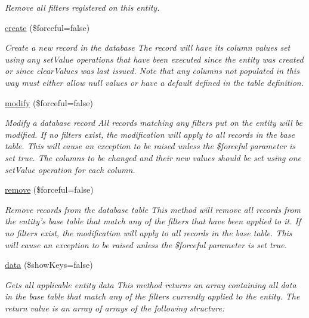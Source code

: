 \begin{DoxyCompactItemize}
\begin{DoxyCompactList}\small\item\em Remove all filters registered on this entity. \end{DoxyCompactList}\item 
\hypertarget{classentity_aa093f16b8fa83dcba92779df20f8a53f}{\hyperlink{classentity_aa093f16b8fa83dcba92779df20f8a53f}{create} (\$forceful=false)}\label{classentity_aa093f16b8fa83dcba92779df20f8a53f}

\begin{DoxyCompactList}\small\item\em Create a new record in the database The record will have its column values set using any set\-Value operations that have been executed since the entity was created or since clear\-Values was last issued. Note that any columns not populated in this way must either allow null values or have a default defined in the table definition. \end{DoxyCompactList}\item 
\hyperlink{classentity_a93f973ae16957a93f792003a89a13be0}{modify} (\$forceful=false)
\begin{DoxyCompactList}\small\item\em Modify a database record All records matching any filters put on the entity will be modified. If no filters exist, the modification will apply to all records in the base table. This will cause an exception to be raised unless the \$forceful parameter is set true. The columns to be changed and their new values should be set using one set\-Value operation for each column. \end{DoxyCompactList}\item 
\hyperlink{classentity_a67aada7aaf1810524e8ae93992f2900c}{remove} (\$forceful=false)
\begin{DoxyCompactList}\small\item\em Remove records from the database table This method will remove all records from the entity's base table that match any of the filters that have been applied to it. If no filters exist, the modification will apply to all records in the base table. This will cause an exception to be raised unless the \$forceful parameter is set true. \end{DoxyCompactList}\item 
\hyperlink{classentity_adfb66dcc511ef54670c2999d9f716eb9}{data} (\$show\-Keys=false)
\begin{DoxyCompactList}\small\item\em Gets all applicable entity data This method returns an array containing all data in the base table that match any of the filters currently applied to the entity. The return value is an array of arrays of the following structure\-: \end{DoxyCompactList}\item 

\end{DoxyCompactItemize}

